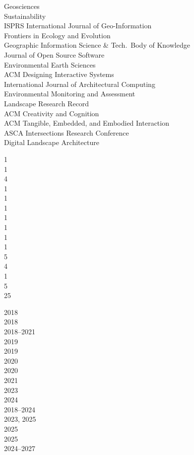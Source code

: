 \documentclass[10pt]{designcv}
\begin{document}


\begin{minipage}[t]{0.65\textwidth}
Geosciences\\
Sustainability\\
ISPRS International Journal of Geo-Information\\
Frontiers in Ecology and Evolution\\
Geographic Information Science \& Tech.~Body of Knowledge\\
Journal of Open Source Software\\
Environmental Earth Sciences\\
ACM Designing Interactive Systems\\
International Journal of Architectural Computing\\
Environmental Monitoring and Assessment\\
Landscape Research Record\\
ACM Creativity and Cognition\\
ACM Tangible, Embedded, and Embodied Interaction\\
ASCA Intersections Research Conference\\
Digital Landscape Architecture\\
\end{minipage}
\hfill
\begin{minipage}[t]{0.05\textwidth}
1\\
1\\
4\\
1\\
1\\
1\\
1\\
1\\
1\\
1\\
5\\
4\\
1\\
5\\
25\\
\end{minipage}
\hfill
\begin{minipage}[t]{0.15\textwidth}
2018\\
2018\\
2018--2021\\
2019\\
2019\\
2020\\
2020\\
2021\\
2023\\
2024\\
2018--2024\\
2023, 2025\\
2025\\
2025\\
2024--2027\\
\end{minipage}
\end{document}
